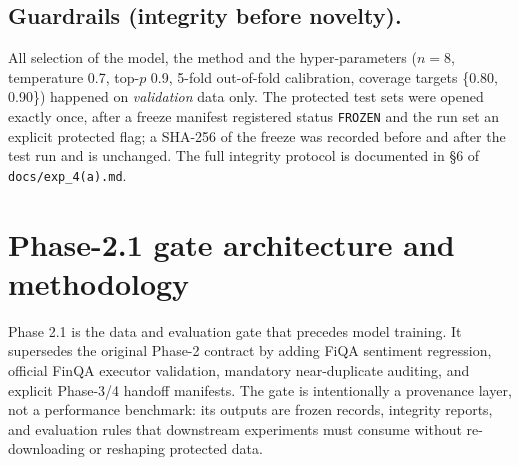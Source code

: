 \documentclass[conference]{IEEEtran}
\begin{document}
\subsection{Guardrails (integrity before novelty).} All selection of the model, the method
and the hyper-parameters ($n=8$, temperature 0.7, top-$p$ 0.9, 5-fold out-of-fold
calibration, coverage targets \{0.80, 0.90\}) happened on \emph{validation} data only. The
protected test sets were opened exactly once, after a freeze manifest registered status
\texttt{FROZEN} and the run set an explicit protected flag; a SHA-256 of the freeze was
recorded before and after the test run and is unchanged. The full integrity protocol is
documented in \S6 of \texttt{docs/exp\_4(a).md}.

\section{Phase-2.1 gate architecture and methodology}\label{sec:phase2}
Phase 2.1 is the data and evaluation gate that precedes model training. It supersedes the
original Phase-2 contract by adding FiQA sentiment regression, official FinQA executor
validation, mandatory near-duplicate auditing, and explicit Phase-3/4 handoff manifests.
The gate is intentionally a provenance layer, not a performance benchmark: its outputs are
frozen records, integrity reports, and evaluation rules that downstream experiments must
consume without re-downloading or reshaping protected data.
\end{document}
